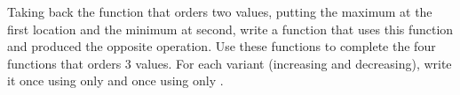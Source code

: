 \label{l4:contract-modularity-ex-order-3}


Taking back the function  that orders two values,
putting the maximum at the first location and the minimum at second, 
write a function  that uses this function and
produced the opposite operation. Use these functions to complete the
four functions that orders 3 values. For each variant (increasing and
decreasing), write it once using only  and once
using only .



